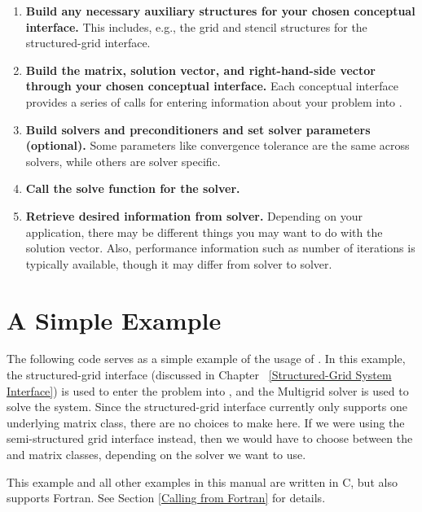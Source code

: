 \begin{enumerate}

\item
{\bf Build any necessary auxiliary structures for your chosen
conceptual interface.} This includes, e.g., the grid and stencil
structures for the structured-grid interface.

\item
{\bf Build the matrix, solution vector, and right-hand-side vector
through your chosen conceptual interface.}  Each conceptual interface
provides a series of calls for entering information about your problem
into \hypre{}.

\item
{\bf Build solvers and preconditioners and set solver parameters
(optional).}  Some parameters like convergence tolerance are the same
across solvers, while others are solver specific.

\item
{\bf Call the solve function for the solver.}

\item
{\bf Retrieve desired information from solver.} Depending on your
application, there may be different things you may want to do with the
solution vector.  Also, performance information such as number of
iterations is typically available, though it may differ from solver to
solver.

\end{enumerate}


\section{A Simple Example}
\label{A Simple Example}

The following code serves as a simple example of the usage of
\hypre{}.  In this example, the structured-grid interface
(discussed in Chapter ~\ref{Structured-Grid System Interface}) is used
to enter the problem into \hypre{}, and the  Multigrid
solver is used to solve the system.  Since the structured-grid
interface currently only supports one underlying matrix class, there
are no choices to make here.  If we were using the semi-structured
grid interface instead, then we would have to choose between the
 and  matrix classes, depending on the
solver we want to use.

This example and all other examples in this manual are written in C,
but \hypre{} also supports Fortran.  See Section
\ref{Calling from Fortran} for details.

